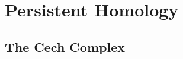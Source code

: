 {%



\section{Persistent Homology}\label{sec:persistent-homology}

\subsection{The Cech Complex}\label{sec:cech-complex}

}
